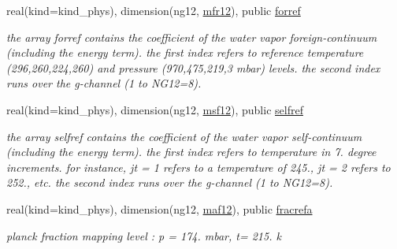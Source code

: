 \begin{Indent}
\begin{DoxyCompactItemize}
real(kind=kind\+\_\+phys), dimension(ng12, \hyperlink{group__module__radlw__kgbnn_gacd751a2e48d0286e3d25a9b658a8367a}{mfr12}), public \hyperlink{group__module__radlw__kgbnn_ga97dac0d0e010441171e09e317e5aeee8}{forref}
\begin{DoxyCompactList}\small\item\em the array forref contains the coefficient of the water vapor foreign-\/continuum (including the energy term). the first index refers to reference temperature (296,260,224,260) and pressure (970,475,219,3 mbar) levels. the second index runs over the g-\/channel (1 to N\+G12=8). \end{DoxyCompactList}\item 
real(kind=kind\+\_\+phys), dimension(ng12, \hyperlink{group__module__radlw__kgbnn_ga3282a15ee0faaafd65509536a59e5b4f}{msf12}), public \hyperlink{group__module__radlw__kgbnn_ga8aaf83ec7a08a244fd1e5396c9fd9b1d}{selfref}
\begin{DoxyCompactList}\small\item\em the array selfref contains the coefficient of the water vapor self-\/continuum (including the energy term). the first index refers to temperature in 7. degree increments. for instance, jt = 1 refers to a temperature of 245., jt = 2 refers to 252., etc. the second index runs over the g-\/channel (1 to N\+G12=8). \end{DoxyCompactList}\item 
real(kind=kind\+\_\+phys), dimension(ng12, \hyperlink{group__module__radlw__kgbnn_ga9d7c05182e21605108bd65f47bb5569c}{maf12}), public \hyperlink{group__module__radlw__kgbnn_ga58ff4f54c11eb12f7ab5157823981b16}{fracrefa}
\begin{DoxyCompactList}\small\item\em planck fraction mapping level \+: p = 174. mbar, t= 215. k \end{DoxyCompactList}\end{DoxyCompactItemize}
\end{Indent}
